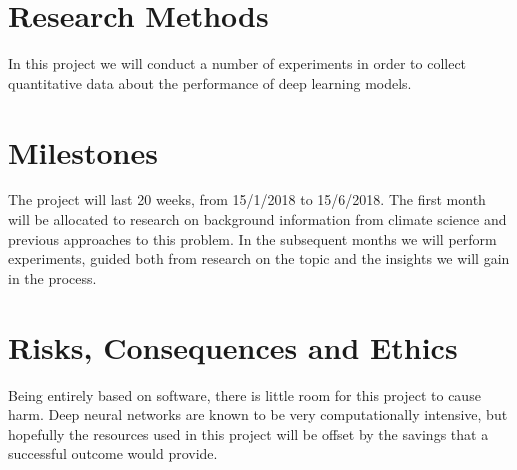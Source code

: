 \documentclass[11pt]{article}
\begin{document}
\section{Research Methods}
\label{sec:org9b365ad}
In this project we will conduct a number of experiments in order to collect quantitative data about the performance of deep learning models.

\section{Milestones}
\label{sec:orge8aaada}
The project will last 20 weeks, from 15/1/2018 to 15/6/2018. The first month will be allocated to research on background information from climate science and previous approaches to this problem. In the subsequent months we will perform experiments, guided both from research on the topic and the insights we will gain in the process. 

\section{Risks, Consequences and Ethics}
\label{sec:org9b5d6c7}
Being entirely based on software, there is little room for this project to cause harm. Deep neural networks are known to be very computationally intensive, but hopefully the resources used in this project will be offset by the savings that a successful outcome would provide.
\end{document}
